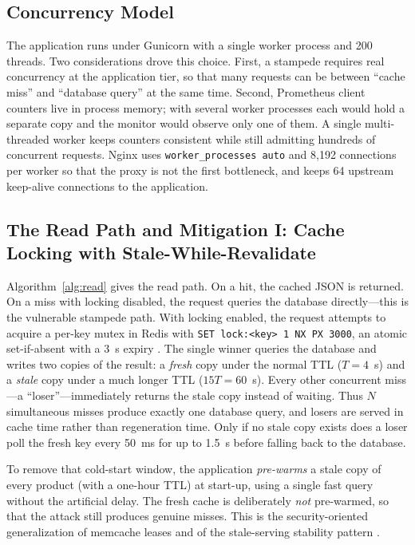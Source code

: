 \documentclass[preprint,12pt]{elsarticle}
\begin{document}
\subsection{Concurrency Model}
The application runs under Gunicorn with a single worker process and 200 threads.
Two considerations drove this choice. First, a stampede requires real concurrency at
the application tier, so that many requests can be between ``cache miss'' and
``database query'' at the same time. Second, Prometheus client counters live in
process memory; with several worker processes each would hold a separate copy and the
monitor would observe only one of them. A single multi-threaded worker keeps counters
consistent while still admitting hundreds of concurrent requests. Nginx uses
\texttt{worker\_processes auto} and 8{,}192 connections per worker so that the proxy is
not the first bottleneck, and keeps 64 upstream keep-alive connections to the
application.

\subsection{The Read Path and Mitigation I: Cache Locking with Stale-While-Revalidate}
\label{sec:design-lock}
Algorithm~\ref{alg:read} gives the read path. On a hit, the cached JSON is returned.
On a miss with locking disabled, the request queries the database directly---this is
the vulnerable stampede path. With locking enabled, the request attempts to acquire a
per-key mutex in Redis with \texttt{SET lock:<key> 1 NX PX 3000}, an atomic
set-if-absent with a 3~s expiry \cite{redisdocs}. The single winner queries the
database and writes two copies of the result: a \emph{fresh} copy under the normal TTL
($T=4$~s) and a \emph{stale} copy under a much longer TTL ($15T=60$~s). Every other
concurrent miss---a ``loser''---immediately returns the stale copy instead of waiting.
Thus $N$ simultaneous misses produce exactly one database query, and losers are served
in cache time rather than regeneration time. Only if no stale copy exists does a loser
poll the fresh key every 50~ms for up to 1.5~s before falling back to the database.

To remove that cold-start window, the application \emph{pre-warms} a stale copy of
every product (with a one-hour TTL) at start-up, using a single fast query without the
artificial delay. The fresh cache is deliberately \emph{not} pre-warmed, so that the
attack still produces genuine misses. This is the security-oriented generalization of
memcache leases \cite{nishtala2013} and of the stale-serving stability pattern
\cite{nygard2018,rfc5861}.
\end{document}
